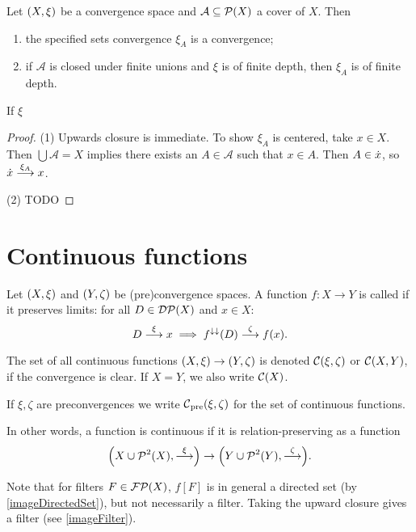 \begin{lemma}
Let $\sSet{X,\xi}$ be a convergence space and $\mathcal{A}\subseteq \operatorname{\mathcal{P}}(X)$ a cover of $X$. Then
\begin{enumerate}
\item the specified sets convergence $\xi_A$ is a convergence;
\item if $\mathcal{A}$ is closed under finite unions and $\xi$ is of finite depth, then $\xi_A$ is of finite depth.
\end{enumerate}


If $\xi $
\end{lemma}
\begin{proof}
(1) Upwards closure is immediate. To show $\xi_A$ is centered, take $x\in X$. Then $\bigcup \mathcal{A} = X$ implies there exists an $A\in \mathcal{A}$ such that $x\in A$. Then $A\in \dot{x}$, so $\dot{x} \overset{\xi_A}{\longrightarrow} x$.

(2) TODO
\end{proof}



\section{Continuous functions}
\begin{definition}
Let $\sSet{X,\xi}$ and $\sSet{Y,\zeta}$ be (pre)convergence spaces. A function $f: X\to Y$ is called  if it preserves limits: for all $D \in \operatorname{\mathcal{DP}}(X)$ and $x\in X$:
\[ D \overset{\xi}{\longrightarrow} x \implies f^{\downarrow\downarrow}(D) \overset{\zeta}{\longrightarrow} f(x). \]

The set of all continuous functions $\sSet{X,\xi} \to \sSet{Y,\zeta}$ is denoted $\operatorname{\mathcal{C}}(\xi, \zeta)$ or $\operatorname{\mathcal{C}}(X,Y)$, if the convergence is clear. If $X=Y$, we also write $\operatorname{\mathcal{C}}(X)$.

If $\xi,\zeta$ are preconvergences we write $\operatorname{\mathcal{C}}_\text{pre}(\xi, \zeta)$ for the set of continuous functions.
\end{definition}
In other words, a function is continuous if it is relation-preserving as a function
\[ \sSet{X \cup \powerset^2(X), \overset{\xi}{\longrightarrow}} \to \sSet{Y \cup \powerset^2(Y), \overset{\zeta}{\longrightarrow}}. \]

Note that for filters $F\in\operatorname{\mathcal{FP}}(X)$, $f[F]$ is in general a directed set (by \ref{imageDirectedSet}), but not necessarily a filter. Taking the upward closure gives a filter (see \ref{imageFilter}).

